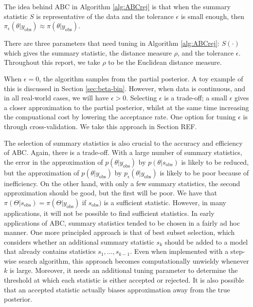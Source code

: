 \documentclass[a4paper,10pt]{article}
\begin{document}
The idea behind ABC in Algorithm \ref{alg:ABCrej} is that when the summary statistic $S$ is representative of the data and the tolerance $\epsilon$ is small enough, then $\pi_{\epsilon}(\theta | y_\textrm{obs}) \approx \pi(\theta | y_\textrm{obs})$.

There are three parameters that need tuning in Algorithm \ref{alg:ABCrej}: $S(\cdot)$ which gives the summary statistic, the distance measure $\rho$, and the tolerance $\epsilon$. Throughout this report, we take $\rho$ to be the Euclidean distance measure. 

When $\epsilon = 0$, the algorithm samples from the partial posterior. A toy example of this is discussed in Section \ref{sec:beta-bin}. However, when data is continuous, and in all real-world cases, we will have $\epsilon > 0$. Selecting $\epsilon$ is a trade-off; a small $\epsilon$ gives a closer approximation to the partial posterior, whilst at the same time increasing the compuational cost by lowering the acceptance rate. One option for tuning $\epsilon$ is through cross-validation. We take this approach in Section REF.

The selection of summary statistics is also crucial to the accuracy and efficiency of ABC. Again, there is a trade-off. With a large number of summary statistics, the error in the approximation of $p(\theta | y_\textrm{obs})$ by $p(\theta | s_\textrm{obs})$ is likely to be reduced, but the approximation of $p(\theta | y_\textrm{obs})$ by $p_\epsilon(\theta | y_\textrm{obs})$ is likely to be poor because of inefficiency. On the other hand, with only a few summary statistics, the second approximation should be good, but the first will be poor. We have that $\pi(\Theta | s_\textrm{obs}) = \pi(\Theta | y_\textrm{obs})$ if $s_\textrm{obs})$ is a sufficient statistic. However, in many applications, it will not be possible to find sufficient statistics. In early applications of ABC, summary statistics tended to be chosen in a fairly ad hoc manner. One more principled approach is that of best subset selection, which considers whether an additional summary statistic $s_k$ should be added to a model that already contains statistics $s_1, \ldots, s_{k-1}$. Even when implemented with a step-wise search algorithm, this approach becomes computationally unwieldy whenever $k$ is large. Moreover, it needs an additional tuning parameter to determine the threshold at which each statistic is either accepted or rejected. It is also possible that an accepted statistic actually biases approximation away from the true posterior.
\end{document}
